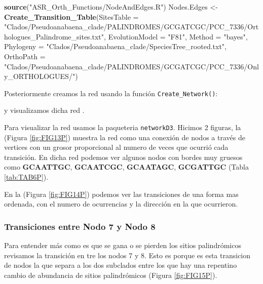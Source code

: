 \documentclass[
]{book}
\newenvironment{Shaded}{\begin{snugshade}}{\end{snugshade}}
\newcommand{\AttributeTok}[1]{\textcolor[rgb]{0.13,0.29,0.53}{#1}}
\newcommand{\FunctionTok}[1]{\textcolor[rgb]{0.13,0.29,0.53}{\textbf{#1}}}
\newcommand{\NormalTok}[1]{#1}
\newcommand{\OtherTok}[1]{\textcolor[rgb]{0.56,0.35,0.01}{#1}}
\newcommand{\StringTok}[1]{\textcolor[rgb]{0.31,0.60,0.02}{#1}}
\begin{document}
\begin{Shaded}
\begin{Highlighting}[]
\FunctionTok{source}\NormalTok{(}\StringTok{"ASR\_Orth\_Functions/NodeAndEdges.R"}\NormalTok{)}
\NormalTok{Nodes.Edges }\OtherTok{\textless{}{-}} \FunctionTok{Create\_Transition\_Table}\NormalTok{(}\AttributeTok{SitesTable =} \StringTok{"Clados/Pseudoanabaena\_clade/PALINDROMES/GCGATCGC/PCC\_7336/Orthologues\_Palindrome\_sites.txt"}\NormalTok{,}
                                \AttributeTok{EvolutionModel =} \StringTok{"F81"}\NormalTok{,}
                                \AttributeTok{Method =} \StringTok{"bayes"}\NormalTok{,}
                                \AttributeTok{Phylogeny =} \StringTok{"Clados/Pseudoanabaena\_clade/SpeciesTree\_rooted.txt"}\NormalTok{,}
                                \AttributeTok{OrthoPath =} \StringTok{"Clados/Pseudoanabaena\_clade/PALINDROMES/GCGATCGC/PCC\_7336/Only\_ORTHOLOGUES/"}\NormalTok{)}
\end{Highlighting}
\end{Shaded}

Posteriormente creamos la red usando la función \texttt{Create\_Network()}:

y visualizamos dicha red .

Para visualizar la red usamos la paqueteria \texttt{networkD3}. Hicimos 2 figuras, la (Figura \ref{fig:FIG13P}) muestra la red como una conexión de nodos a través de vertices con un grosor proporcional al numero de veces que ocurrió cada transición. En dicha red podemos ver algunos nodos con bordes muy gruesos como \textbf{GCAATTGC}, \textbf{GCAATCGC}, \textbf{GCAATAGC}, \textbf{GCGATTGC} (Tabla \ref{tab:TAB6P}).

En la (Figura \ref{fig:FIG14P}) podemos ver las transiciones de una forma mas ordenada, con el numero de ocurrencias y la dirección en la que ocurrieron.

\hypertarget{transiciones-entre-nodo-7-y-nodo-8}{%
\subsubsection{Transiciones entre Nodo 7 y Nodo 8}\label{transiciones-entre-nodo-7-y-nodo-8}}

Para entender más como es que se gana o se pierden los sitios palindrómicos revisamos la transición en tre los nodos 7 y 8. Esto es porque es esta transicion de nodos la que separa a los dos subclados entre los que hay una repentino cambio de abundancia de sitios palindrómicos (Figura \ref{fig:FIG15P}).
\end{document}
